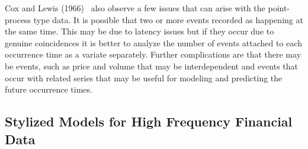 Cox and Lewis (1966)~\cite{cox1966} also observe a few issues that can arise with the point-process type data. It is possible that two or more events recorded as happening at the same time. This may be due to latency issues but if they occur due to genuine coincidences it is better to analyze the number of events attached to each occurrence time as a variate separately. Further complications are that there may be events, such as price and volume that may be interdependent and events that occur with related series that may be useful for modeling and predicting the future occurrence times.


\subsection{Stylized Models for High Frequency Financial Data}


